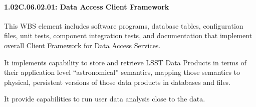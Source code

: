 \paragraph*{1.02C.06.02.01: Data Access Client Framework}

This WBS element includes software programs, database tables, configuration files, unit tests, component integration tests, and documentation that implement overall Client Framework for Data Access Services.

It implements capability to store and retrieve LSST Data Products in terms of their application level ``astronomical'' semantics, mapping those semantics to physical, persistent versions of those data products in databases and files.

It provide capabilities to run user data analysis close to the data.
